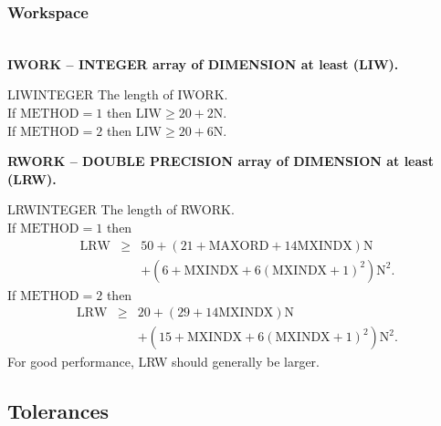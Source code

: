\subsubsection{Workspace}\label{workspace}\quad\\
\noindent
{\bf{IWORK} -- {INTEGER array of DIMENSION at least (LIW)}.}\quad\\
\begin{entry}{LIW}{INTEGER}
  The length of IWORK. \\
  If $\mbox{METHOD}=1$ then $\mbox{LIW} \ge 20+2\mbox{N}$.\\
  If $\mbox{METHOD}=2$ then $\mbox{LIW} \ge 20+6\mbox{N}$.
\end{entry}
\noindent
{\bf{RWORK} -- {DOUBLE PRECISION array of DIMENSION at least (LRW)}.}
\quad\\
\begin{entry}{LRW}{INTEGER}
  The length of RWORK.\\
  If $\mbox{METHOD}=1$ then
  \begin{eqnarray*}
    \mbox{LRW} &\ge& 50 + (21 + \mbox{MAXORD}+
    14\mbox{MXINDX})\mbox{N}\\
    &&+ (6 + \mbox{MXINDX} + 6(\mbox{MXINDX}+1)^2) \mbox{N}^2.
  \end{eqnarray*}
  If $\mbox{METHOD}=2$ then
  \begin{eqnarray*}
    \mbox{LRW} &\ge& 20 + (29 + 14\mbox{MXINDX})\mbox{N} \\
    && + (15 + \mbox{MXINDX} + 6(\mbox{MXINDX}+1)^2) \mbox{N}^2.
  \end{eqnarray*}
  For good performance, LRW should generally be larger.
\end{entry}

\subsection{Tolerances}

